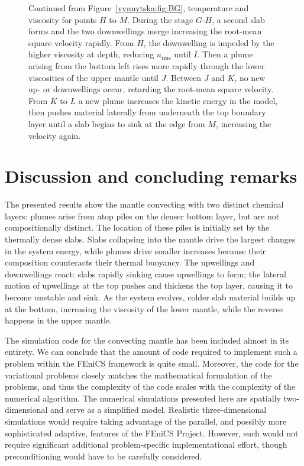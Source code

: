 \begin{figure}[!t]
  \caption{Continued from Figure~\ref{vynnytska:fig:BG}, temperature and
    viscosity for points $H$ to $M$. During the stage $G$-$H$, a second
    slab forms and the two downwellings merge increasing the root-mean
    square velocity rapidly. From $H$, the downwelling is impeded by the
    higher viscosity at depth, reducing $u_{\mathrm{rms}}$ until $I$. Then a
    plume arising from the bottom left rises more rapidly through the
    lower viscosities of the upper mantle until $J$. Between $J$ and
    $K$, no new up- or downwellings occur, retarding the root-mean
    square velocity. From $K$ to $L$ a new plume increases the kinetic
    energy in the model, then pushes material laterally from underneath
    the top boundary layer until a slab begins to sink at the edge from
    $M$, increasing the velocity again.}
  \label{vynnytska:fig:HM}
\end{figure}


\section{Discussion and concluding remarks}

The presented results show the mantle convecting with two distinct
chemical layers: plumes arise from atop piles on the denser bottom layer,
but are not compositionally distinct. The location of these piles is
initially set by the thermally dense slabs. Slabs collapsing into the
mantle drive the largest changes in the system energy, while plumes
drive smaller increases because their composition counteracts their
thermal buoyancy.\enlargethispage*{6pt} The upwellings and downwellings react: slabs rapidly
sinking cause upwellings to form; the lateral motion of upwellings at
the top pushes and thickens the top layer, causing it to become unstable
and sink. As the system evolves, colder slab material builds up at the
bottom, increasing the viscosity of the lower mantle, while the reverse
happens in the upper mantle.

The simulation code for the convecting mantle has been included almost
in its entirety. We can conclude that the amount of code required
to implement such a problem within the FEniCS framework is quite
small. Moreover, the code for the variational problems closely matches
the mathematical formulation of the problems, and thus the complexity
of the code scales with the complexity of the numerical algorithm.
The numerical simulations presented here are spatially two-dimensional and
serve as a simplified model. Realistic three-dimensional simulations would
require taking advantage of the parallel, and possibly more sophisticated
adaptive, features of the FEniCS Project. However, such would not require
significant additional problem-specific implementational effort, though
preconditioning would have to be carefully considered.

